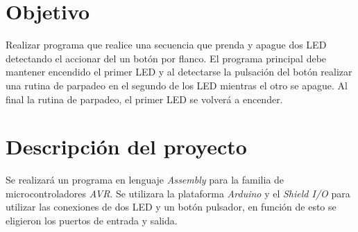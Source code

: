 \section{Objetivo}
Realizar programa que realice una secuencia que prenda y apague dos LED detectando el accionar del un botón por flanco. El programa principal debe mantener encendido el primer LED y al detectarse la pulsación del botón realizar una rutina de parpadeo en el segundo de los LED mientras el otro se apague. Al final la rutina de parpadeo, el primer LED se volverá a encender.

\section{Descripción del proyecto}
Se realizar\'a un programa en lenguaje \textit{Assembly} para la familia de microcontroladores \textit{AVR}.
Se utilizara la plataforma \textit{Arduino} y el \textit{Shield I/O} para utilizar las conexiones de dos LED y un botón pulsador, en función de esto se eligieron los puertos de entrada y salida.



